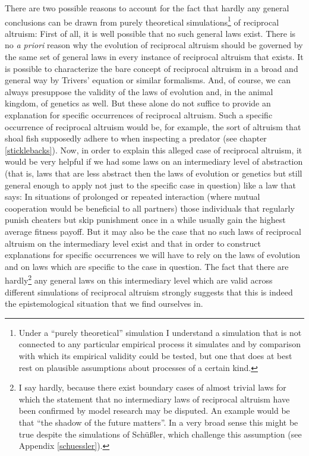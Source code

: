 There are two possible reasons to account for the fact that hardly any general
conclusions can be drawn from purely theoretical simulations\footnote{Under a
  ``purely theoretical'' simulation I understand a simulation that is not
  connected to any particular empirical process it simulates and by comparison
  with which its empirical validity could be tested, but one that does at best
  rest on plausible assumptions about processes of a certain kind.} of
reciprocal altruism: First of all, it is well possible that no such general
laws exist. There is no {\em a priori} reason why the evolution of reciprocal
altruism should be governed by the same set of general laws in every instance
of reciprocal altruism that exists. It is possible to characterize the bare
concept of reciprocal altruism in a broad and general way by Trivers' equation
or similar formalisms. And, of course, we can always presuppose the validity
of the laws of evolution and, in the animal kingdom, of genetics as well. But
these alone do not suffice to provide an explanation for specific occurrences
of reciprocal altruism. Such a specific occurrence of reciprocal altruism
would be, for example, the sort of altruism that shoal fish supposedly
adhere to when inspecting a predator (see chapter \ref{sticklebacks}). Now, in
order to explain this alleged case of reciprocal altruism, it would be very
helpful if we had some laws on an intermediary level of abstraction (that is,
laws that are less abstract then the laws of evolution or genetics but still
general enough to apply not just to the specific case in question)
like a law that says: In situations of prolonged or repeated interaction
(where mutual cooperation would be beneficial to all partners) those
individuals that regularly punish cheaters but skip punishment once in a while
usually gain the highest average fitness payoff. But it may also be the case
that no such laws of reciprocal altruism on the intermediary level exist and
that in order to construct explanations for specific occurrences we will have
to rely on the laws of evolution and on laws which are specific to the case in
question. The fact that there are hardly\footnote{I say hardly, because there
  exist boundary cases of almost trivial laws for which the statement that no
  intermediary laws of reciprocal altruism have been confirmed by model
  research may be disputed. An example would be that ``the shadow of the
  future matters''. In a very broad sense this might be true despite the
  simulations of Schüßler, which challenge this assumption (see Appendix
  \ref{schuessler}).} any general laws on this intermediary level which are
valid across different simulations of reciprocal altruism strongly suggests
that this is indeed the epistemological situation that we find ourselves in.

